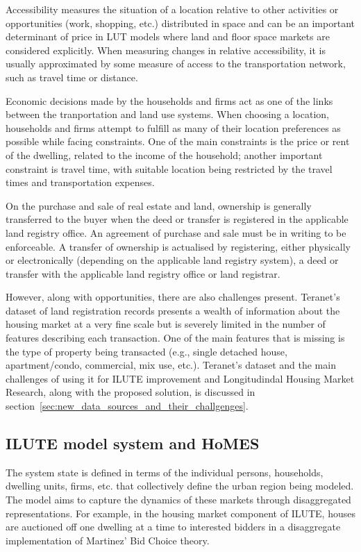 Accessibility measures the situation of a location relative to other activities or opportunities (work, shopping, etc.) distributed in space and can be an important determinant of price in LUT models where land and floor space markets are considered explicitly\cite{Iacono2008}.
When measuring changes in relative accessibility, it is usually approximated by some measure of access to the transportation network, such as travel time or distance.

Economic decisions made by the households and firms act as one of the links between the tranportation and land use systems.
When choosing a location, households and firms attempt to fulfill as many of their location preferences as possible while facing constraints.
One of the main constraints is the price or rent of the dwelling, related to the income of the household;
another important constraint is travel time, with suitable location being restricted by the travel times and transportation expenses\cite{Moeckel2017}.

On the purchase and sale of real estate and land, ownership is generally transferred to the buyer when the deed or transfer is registered in the applicable land registry office.
An agreement of purchase and sale must be in writing to be enforceable.
A transfer of ownership is actualised by registering, either physically or electronically (depending on the applicable land registry system), a deed or transfer with the applicable land registry office or land registrar.

However, along with opportunities, there are also challenges present.
Teranet's dataset of land registration records presents a wealth of information about the housing market at a very fine scale but is severely limited in the number of features describing each transaction.
One of the main features that is missing is the type of property being transacted (e.g., single detached house, apartment/condo, commercial, mix use, etc.).
Teranet's dataset and the main challenges of using it for ILUTE improvement and Longitudindal Housing Market Research, along with the proposed solution, is discussed in section~\ref{sec:new_data_sources_and_their_challgenges}.

\subsection{ILUTE model system and HoMES} \label{subsec:ilute_and_homes}

The system state is defined in terms of the individual persons, households, dwelling units, firms, etc.
that collectively define the urban region being modeled\cite{Miller2011}.
The model aims to capture the dynamics of these markets through disaggregated representations.
For example, in the housing market component of ILUTE, houses are auctioned off one dwelling at a time to interested bidders in a disaggregate implementation of Martinez' Bid Choice theory\cite{Martinez1992}.

